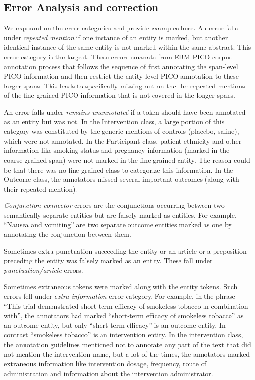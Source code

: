 \documentclass[10.7pt,]{article}
\begin{document}
\subsection{Error Analysis and correction}\label{err_ana}
%
We expound on the error categories and provide examples here.
An error falls under \textit{repeated mention} if one instance of an entity is marked, but another identical instance of the same entity is not marked within the same abstract. 
This error category is the largest.
These errors emanate from EBM-PICO corpus annotation process that follows the sequence of first annotating the span-level PICO information and then restrict the entity-level PICO annotation to these larger spans.
This leads to specifically missing out on the the repeated mentions of the fine-grained PICO information that is not covered in the longer spans.

An error falls under \textit{remains unannotated} if a token should have been annotated as an entity but was not.
In the Intervention class, a large portion of this category was constituted by the generic mentions of controls (placebo, saline), which were not annotated.
In the Participant class, patient ethnicity and other information like smoking status and pregnancy information (marked in the coarse-grained span) were not marked in the fine-grained entity.
The reason could be that there was no fine-grained class to categorize this information. 
In the Outcome class, the annotators missed several important outcomes (along with their repeated mention).

\textit{Conjunction connector} errors are the conjunctions occurring between two semantically separate entities but are falsely marked as entities.
For example, ``Nausea and vomiting'' are two separate outcome entities marked as one by annotating the conjunction between them.

Sometimes extra punctuation succeeding the entity or an article or a preposition preceding the entity was falsely marked as an entity. These fall under \textit{punctuation/article} errors.

Sometimes extraneous tokens were marked along with the entity tokens. 
Such errors fell under \textit{extra information} error category.
For example, in the phrase ``This trial demonstrated short-term efficacy of smokeless tobacco in combination with'', the annotators had marked ``short-term efficacy of smokeless tobacco'' as an outcome entity, but only ``short-term efficacy'' is an outcome entity. In contrast ``smokeless tobacco'' is an intervention entity. 
In the intervention class, the annotation guidelines mentioned not to annotate any part of the text that did not mention the intervention name, but a lot of the times, the annotators marked extraneous information like intervention dosage, frequency, route of administration and information about the intervention administrator.
\end{document}
